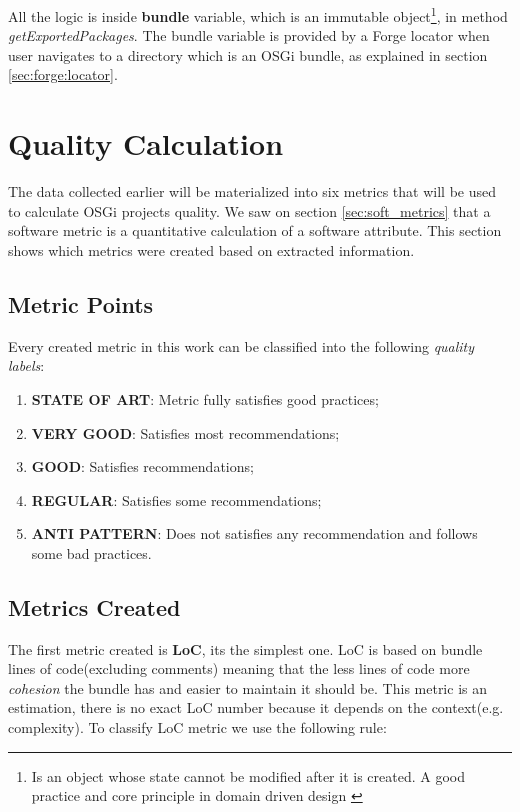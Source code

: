 All the logic is inside \textbf{bundle} variable, which is an immutable object\footnote{Is an object whose state cannot be modified after it is created. A good practice and core principle in domain driven design \citep{Evans 2003}}, in method \emph{getExportedPackages}. The bundle variable is provided by a Forge locator when user navigates to a directory which is an OSGi bundle, as explained in section \ref{sec:forge:locator}. 

\section{Quality Calculation}
The data collected earlier will be materialized into six metrics that will be used to calculate OSGi projects quality. We saw on section \ref{sec:soft_metrics} that a software metric is a quantitative calculation of a software attribute. This section shows which metrics were created based on extracted information.


\subsection{Metric Points}
Every created metric in this work can be classified into the following \emph{quality labels}:

\begin{enumerate}
\item \textbf{STATE OF ART}: Metric fully satisfies good practices;
\item \textbf{VERY GOOD}: Satisfies most recommendations;
\item \textbf{GOOD}: Satisfies recommendations;
\item \textbf{REGULAR}: Satisfies some recommendations;
\item \textbf{ANTI PATTERN}: Does not satisfies any recommendation and follows some bad practices.
\end{enumerate}

\subsection{Metrics Created}

The first metric created is \textbf{LoC}, its the simplest one. LoC is based on bundle lines of code(excluding comments) meaning that the less lines of code more \emph{cohesion} the bundle has and easier to maintain it should be. This metric is an estimation, there is no exact LoC number because it depends on the context(e.g. complexity). To classify LoC metric we use the following rule:\newline


